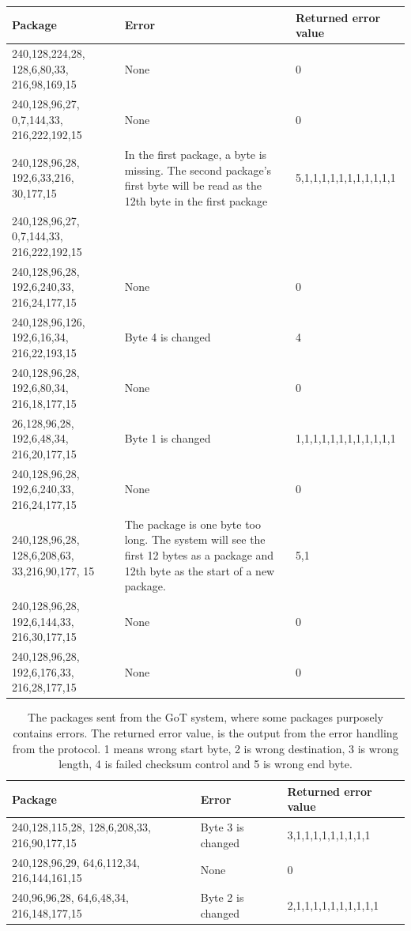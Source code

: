\begin{table}[H]
\centering
\begin{tabular}{|p{3cm}|p{8cm}|p{4cm}|}
\hline
Package & Error & Returned error value \\
\hline
240,128,224,28, 128,6,80,33, 216,98,169,15 & None & 0 \\
\hline
240,128,96,27, 0,7,144,33, 216,222,192,15 & None & 0 \\
\hline
240,128,96,28, 192,6,33,216, 30,177,15 & In the first package, a byte is missing. The second package's first byte will be read as the 12th byte in the first package & 5,1,1,1,1,1,1,1,1,1,1,1 \\
\cline{1-1}
240,128,96,27, 0,7,144,33, 216,222,192,15 & & \\
\hline
240,128,96,28, 192,6,240,33, 216,24,177,15 & None & 0 \\
\hline
240,128,96,126, 192,6,16,34, 216,22,193,15 & Byte 4 is changed & 4 \\
\hline
240,128,96,28, 192,6,80,34, 216,18,177,15 & None & 0 \\
\hline
26,128,96,28, 192,6,48,34, 216,20,177,15 & Byte 1 is changed & 1,1,1,1,1,1,1,1,1,1,1,1 \\
\hline
240,128,96,28, 192,6,240,33, 216,24,177,15 & None & 0 \\
\hline
240,128,96,28, 128,6,208,63, 33,216,90,177, 15 & The package is one byte too long. The system will see the first 12 bytes as a package and 12th byte as the start of a new package. & 5,1 \\
\hline
240,128,96,28, 192,6,144,33, 216,30,177,15 & None & 0 \\
\hline
240,128,96,28, 192,6,176,33, 216,28,177,15 & None & 0 \\
\hline
\end{tabular}
\end{table}

\begin{table}[H]
\centering
\begin{tabular}{|p{3cm}|p{8cm}|p{4cm}|}
\hline
Package & Error & Returned error value \\
\hline
240,128,115,28, 128,6,208,33, 216,90,177,15 & Byte 3 is changed & 3,1,1,1,1,1,1,1,1,1 \\
\hline
240,128,96,29, 64,6,112,34, 216,144,161,15 & None & 0 \\
\hline
240,96,96,28, 64,6,48,34, 216,148,177,15 & Byte 2 is changed & 2,1,1,1,1,1,1,1,1,1,1 \\
\hline
\end{tabular}
\caption{The packages sent from the GoT system, where some packages purposely contains errors. The returned error value, is the output from the error handling from the protocol. 1 means wrong start byte, 2 is wrong destination, 3 is wrong length, 4 is failed checksum control and 5 is wrong end byte.}
\label{AccT2tab}
\end{table}

